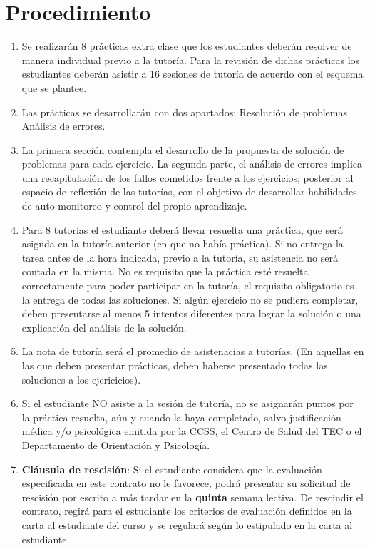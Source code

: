 \documentclass[11pt]{proc}
\begin{document}
\section*{Procedimiento}
\begin{enumerate}
\item Se realizarán 8 prácticas extra clase que los estudiantes deberán resolver de manera individual previo a la tutoría. Para la revisión de dichas prácticas los estudiantes deberán asistir a 16 sesiones de tutoría de acuerdo con el esquema que se plantee.
\item Las prácticas se desarrollarán con dos apartados: \subitem Resolución de problemas \subitem Análisis de errores. 
\item La primera sección contempla el desarrollo de la propuesta de solución de problemas para cada ejercicio. La segunda parte, el análisis de errores implica una recapitulación de los fallos cometidos frente a los ejercicios; posterior al espacio de reflexión de las tutorías, con el objetivo de desarrollar habilidades de auto monitoreo y control del propio aprendizaje. 

\item Para 8 tutorías el estudiante deberá llevar resuelta una práctica, que será asignda en la tutoría anterior (en que no había práctica). Si no entrega la tarea antes de la hora indicada, previo a la tutoría, su asistencia no será contada en la misma. No es requisito que la práctica esté resuelta correctamente para poder participar en la tutoría, el requisito obligatorio es la entrega de todas las soluciones. Si algún ejercicio no se pudiera completar, deben presentarse al menos 5 intentos diferentes para lograr la solución o una explicación del análisis de la solución.
\item La nota de tutoría será el promedio de asistenacias a tutorías. (En aquellas en las que deben presentar prácticas, deben haberse presentado todas las soluciones a los ejericicios).
\item Si el estudiante NO asiste a la sesión de tutoría, no se asignarán puntos por la práctica resuelta, aún y cuando la haya completado, salvo justificación médica y/o psicológica emitida por la CCSS, el Centro de Salud del TEC o el Departamento de Orientación y Psicología.
\item \textbf{Cláusula de rescisión}: Si el estudiante considera que la evaluación especificada en este contrato no le favorece, podrá presentar su solicitud de rescisión por escrito a más tardar en la \textbf{quinta} semana lectiva. De rescindir el contrato, regirá para el estudiante los criterios de evaluación definidos en la carta al estudiante del curso y se regulará según lo estipulado en la carta al estudiante.
\end{enumerate}
\end{document}
